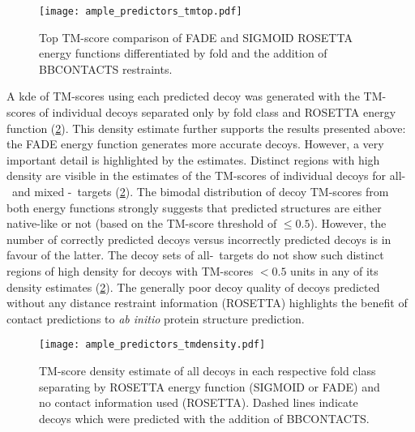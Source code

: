 \begin{figure}[H]
    \centering
    \texttt{[image: ample\_predictors\_tmtop.pdf]}
    \caption{Top TM-score comparison of FADE and SIGMOID ROSETTA energy functions differentiated by fold and the addition of BBCONTACTS restraints.}
    \label{fig:ample_predictor_tmtop}
\end{figure}

A \acrfull{kde} of TM-scores using each predicted decoy was generated with the TM-scores of individual decoys separated only by fold class and ROSETTA energy function (\cref{fig:ample_predictor_tmdensity}). This density estimate further supports the results presented above: the FADE energy function generates more accurate decoys. However, a very important detail is highlighted by the estimates. Distinct regions with high density are visible in the estimates of the TM-scores of individual decoys for all-\textalpha\ and mixed \textalpha-\textbeta\ targets (\cref{fig:ample_predictor_tmdensity}). The bimodal distribution of decoy TM-scores from both energy functions strongly suggests that predicted structures are either native-like or not (based on the TM-score threshold of $\leq0.5$). However, the number of correctly predicted decoys versus incorrectly predicted decoys is in favour of the latter. The decoy sets of all-\textbeta\ targets do not show such distinct regions of high density for decoys with TM-scores $<0.5$ units in any of its density estimates (\cref{fig:ample_predictor_tmdensity}). The generally poor decoy quality of decoys predicted without any distance restraint information (ROSETTA) highlights the benefit of contact predictions to \textit{ab initio} protein structure prediction.

\begin{figure}[H]
    \centering
    \texttt{[image: ample\_predictors\_tmdensity.pdf]}
    \caption{TM-score density estimate of all decoys in each respective fold class separating by ROSETTA energy function (SIGMOID or FADE) and no contact information used (ROSETTA). Dashed lines indicate decoys which were predicted with the addition of BBCONTACTS.}
    \label{fig:ample_predictor_tmdensity}
\end{figure}

